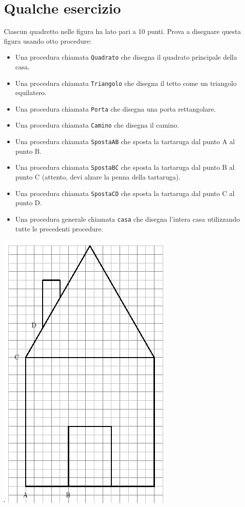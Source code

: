 \section{Qualche esercizio}
Ciascun quadretto nelle figura ha lato pari a 10 punti. Prova a disegnare questa figura usando otto procedure:
\begin{itemize}
	\item Una procedura chiamata \texttt{Quadrato} che disegna il quadrato principale della casa.
	\item Una procedura chiamata \texttt{Triangolo} che disegna il tetto come un triangolo equilatero.
	\item Una procedura chiamata \texttt{Porta} che disegna una porta rettangolare.
	\item Una procedura chiamata \texttt{Camino} che disegna il camino.
	\item Una procedura chiamata \texttt{SpostaAB} che sposta la tartaruga dal punto A al punto B.
	\item Una procedura chiamata \texttt{SpostaBC} che sposta la tartaruga dal punto B al punto C (attento, devi alzare la penna della tartaruga).
	\item Una procedura chiamata \texttt{SpostaCD} che sposta la tartaruga dal punto C al punto D.
	\item Una procedura generale chiamata  \texttt{casa} che disegna l'intera casa utilizzando tutte le precedenti procedure.
\end{itemize}
\label{maison}
\begin{center}
	\includegraphics[scale=0.6]{pics/bases-maison.png}
\end{center}